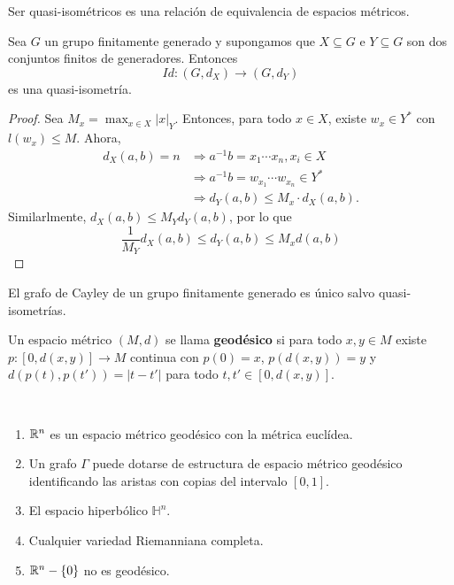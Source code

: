 \documentclass[twoside, 11pt]{article}
\begin{document}
\begin{coro}
Ser quasi-isométricos es una relación de equivalencia de espacios métricos.
\end{coro}

\begin{lemma}
Sea $G$ un grupo finitamente generado y supongamos que $X\subseteq G$ e $Y\subseteq G$ son dos conjuntos finitos de generadores. Entonces
\[
Id:(G,d_X)\to (G,d_Y)
\]
es una quasi-isometría.
\end{lemma}
\begin{proof}
Sea $M_x=\max_{x\in X} |x|_Y$. Entonces, para todo $x\in X$, existe $w_x\in Y^*$ con $l(w_x)\leq M$. Ahora, 
\begin{align*}
d_X(a,b)=n &\Rightarrow a^{-1}b=x_1\cdots x_n, x_i\in X\\
& \Rightarrow a^{-1}b=w_{x_1}\cdots w_{x_n}\in Y^*\\
& \Rightarrow d_Y(a,b)\leq M_x\cdot d_X(a,b).
\end{align*}
Similarlmente, $d_X(a,b)\leq M_Y d_Y(a,b)$, por lo que
\[
\frac{1}{M_Y}d_X(a,b)\leq d_Y(a,b)\leq M_xd(a,b)
\]
\end{proof}

\begin{coro}
El grafo de Cayley de un grupo finitamente generado es único salvo quasi-isometrías.
\end{coro}

\begin{defi}
Un espacio métrico $(M,d)$ se llama \textbf{geodésico} si para todo $x,y\in M$ existe $p:[0,d(x,y)]\to M$ continua con $p(0)=x$, $p(d(x,y))=y$ y $d(p(t),p(t'))=|t-t'|$ para todo $t,t'\in [0,d(x,y)]$. 
\end{defi}

\begin{ejs}\
\begin{enumerate}
\item $\mathbb{R}^n$ es un espacio métrico geodésico con la métrica euclídea.
\item Un grafo $\Gamma$ puede dotarse de estructura de espacio métrico geodésico identificando las aristas con copias del intervalo $[0,1]$. 
\item El espacio hiperbólico $\mathbb{H}^n$. 
\item Cualquier variedad Riemanniana completa.
\item $\mathbb{R}^n-\{0\}$ no es geodésico. 
\end{enumerate}
\end{ejs}
\end{document}
